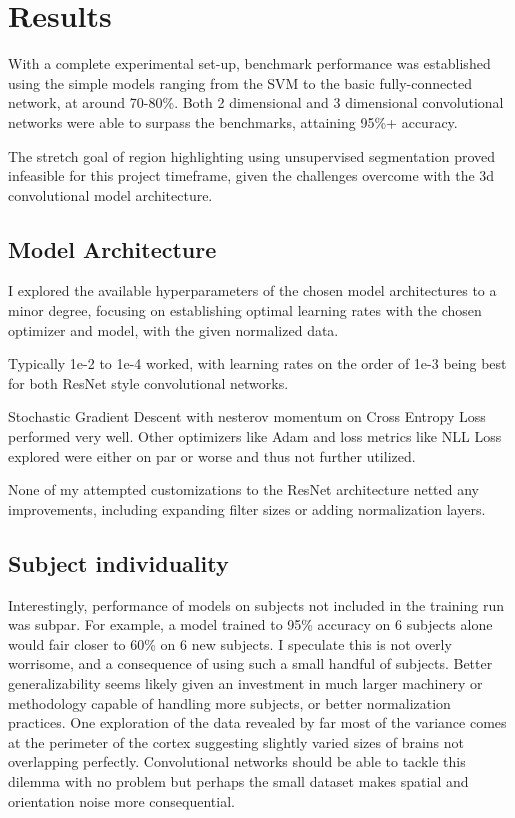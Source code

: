 \section{Results}\label{sec:results}

With a complete experimental set-up, benchmark performance was established using the simple models ranging from the
SVM to the basic fully-connected network, at around 70-80\%.
Both 2 dimensional and 3 dimensional convolutional networks were able to surpass the benchmarks,
attaining 95\%+ accuracy.

The stretch goal of region highlighting using unsupervised segmentation proved infeasible for this project timeframe, given
the challenges overcome with the 3d convolutional model architecture.

\subsection{Model Architecture}\label{subsec:model-arch}

I explored the available hyperparameters of the chosen model architectures to a minor degree, focusing on
establishing optimal learning rates with the chosen optimizer and model, with the given normalized data.

Typically 1e-2 to 1e-4 worked, with learning rates on the order of 1e-3 being best for both ResNet style convolutional
networks.

Stochastic Gradient Descent with nesterov momentum on Cross Entropy Loss performed very well.
Other optimizers like Adam and loss metrics like NLL Loss explored were either on par or worse and thus not
further utilized.

None of my attempted customizations to the ResNet architecture netted any improvements, including expanding filter sizes
or adding normalization layers.

\subsection{Subject individuality}\label{subsec:subjects-individ}

Interestingly, performance of models on subjects not included in the training run was subpar.
For example, a model trained to 95\% accuracy on 6 subjects alone would fair closer to 60\% on 6 new subjects.
I speculate this is not overly worrisome, and a consequence of using such a small handful of subjects.
Better generalizability seems likely given an investment in much larger machinery or methodology capable of handling
more subjects, or better normalization practices.
One exploration of the data revealed by far most of the variance comes at the perimeter of the cortex suggesting slightly
varied sizes of brains not overlapping perfectly.
Convolutional networks should be able to tackle this dilemma with no problem but perhaps the small dataset makes
spatial and orientation noise more consequential.

